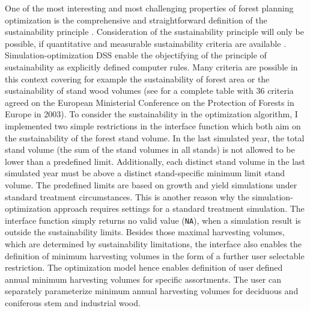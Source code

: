 One of the most interesting and most challenging properties of forest planning optimization is the comprehensive and straightforward definition of the sustainability principle \citep[p. 15]{kangas_2015}. Consideration of the sustainability principle  will only be possible, if quantitative and measurable sustainability criteria are available \citep[p. 101]{spellmann_2010}. Simulation-optimization DSS enable the objectifying of the principle of sustainability as explicitly defined computer rules. Many criteria are possible in this context covering for example the sustainability of forest area or the sustainability of stand wood volumes (see \citet[p. 102]{spellmann_2010} for a complete table with 36 criteria agreed on the European Ministerial Conference on the Protection of Forests in Europe in 2003). To consider the sustainability in the optimization algorithm, I implemented two simple restrictions in the interface function which both aim on the sustainability of the forest stand volume. In the last simulated year, the total stand volume (the sum of the stand volumes in all stands) is not allowed to be lower than a predefined limit. Additionally, each distinct stand volume in the last simulated year must be above a distinct stand-specific minimum limit stand volume. The predefined limits are based on growth and yield simulations under standard treatment circumstances. This is another reason why the simulation-optimization approach requires settings for a standard treatment simulation. The interface function simply returns no valid value (\texttt{NA}), when a simulation result is outside the sustainability limits. Besides those maximal harvesting volumes, which are determined by sustainability limitations, the interface also enables the definition of minimum harvesting volumes in the form of a further user selectable restriction. The optimization model hence enables definition of user defined annual minimum harvesting volumes for specific assortments. The user can separately parameterize minimum annual harvesting volumes for deciduous and coniferous stem and industrial wood.


